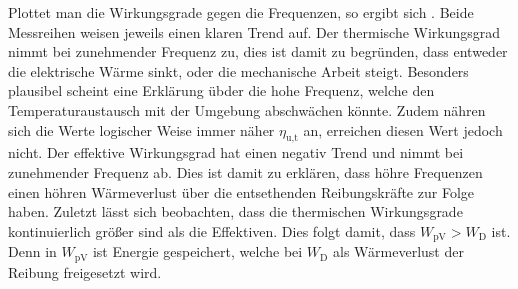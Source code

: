 Plottet man die Wirkungsgrade gegen die Frequenzen, so ergibt sich . Beide Messreihen weisen jeweils einen klaren Trend auf. Der thermische Wirkungsgrad nimmt bei zunehmender Frequenz zu, dies ist damit zu begründen, dass entweder die elektrische Wärme sinkt, oder die mechanische Arbeit steigt. Besonders plausibel scheint eine Erklärung übder die hohe Frequenz, welche den Temperaturaustausch mit der Umgebung abschwächen könnte. Zudem nähren sich die Werte logischer Weise immer näher $\eta_\text{u,t}$ an, erreichen diesen Wert jedoch nicht. 
Der effektive Wirkungsgrad hat einen negativ Trend und nimmt bei zunehmender Frequenz ab. Dies ist damit zu erklären, dass höhre Frequenzen einen höhren Wärmeverlust über die entsethenden Reibungskräfte zur Folge haben. 
Zuletzt lässt sich beobachten, dass die thermischen Wirkungsgrade kontinuierlich größer sind als die Effektiven. Dies folgt damit, dass $W_\text{pV} > W_\text{D}$ ist. Denn in $W_\text{pV}$ ist Energie gespeichert, welche bei $ W_\text{D}$ als Wärmeverlust der Reibung freigesetzt wird.